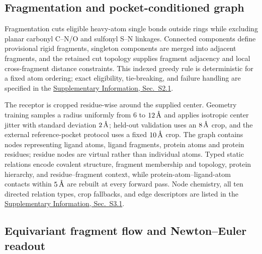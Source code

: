 \documentclass{article}
\newcommand{\angstrom}{\text{\normalfont\AA}}
\newcommand{\sisection}[1]{\href{SI.pdf}{Supplementary Information, Sec.~#1}}
\begin{document}
\subsection{Fragmentation and pocket-conditioned graph}
\label{sec:fragmentation}
\label{sec:graph}

Fragmentation cuts eligible heavy-atom single bonds outside rings while excluding planar carbonyl C--N/O and sulfonyl S--N linkages.
Connected components define provisional rigid fragments, singleton components are merged into adjacent fragments, and the retained cut topology supplies fragment adjacency and local cross-fragment distance constraints.
This indexed greedy rule is deterministic for a fixed atom ordering; exact eligibility, tie-breaking, and failure handling are specified in the \sisection{S2.1}.

The receptor is cropped residue-wise around the supplied center.
Geometry training samples a radius uniformly from \(6\) to \(12\,\angstrom\) and applies isotropic center jitter with standard deviation \(2\,\angstrom\); held-out validation uses an \(8\,\angstrom\) crop, and the external reference-pocket protocol uses a fixed \(10\,\angstrom\) crop.
The graph contains nodes representing ligand atoms, ligand fragments, protein atoms and protein residues; residue nodes are virtual rather than individual atoms.
Typed static relations encode covalent structure, fragment membership and topology, protein hierarchy, and residue--fragment context, while protein-atom--ligand-atom contacts within \(5\,\angstrom\) are rebuilt at every forward pass.
Node chemistry, all ten directed relation types, crop fallbacks, and edge descriptors are listed in the \sisection{S3.1}.

\subsection{Equivariant fragment flow and Newton--Euler readout}
\label{sec:flow}
\end{document}
